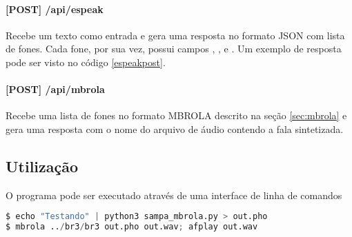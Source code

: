 \paragraph{[POST] /api/espeak} Recebe um texto como entrada e gera uma resposta
no formato JSON com lista de fones. Cada fone, por sua vez, possui campos ,
,  e . Um exemplo de resposta pode ser visto no código \ref{espeakpost}.
\paragraph{[POST] /api/mbrola} Recebe uma lista de fones no formato MBROLA
descrito na seção \ref{sec:mbrola} e gera uma resposta com o nome do arquivo de
áudio contendo a fala sintetizada.
\subsection{Utilização}
O programa pode ser executado através de uma interface de linha de comandos

\begin{lstlisting}[caption=Utilização por linha de comandos, label=cmdline, language=Python]
$ echo "Testando" | python3 sampa_mbrola.py > out.pho
$ mbrola ../br3/br3 out.pho out.wav; afplay out.wav
\end{lstlisting}


